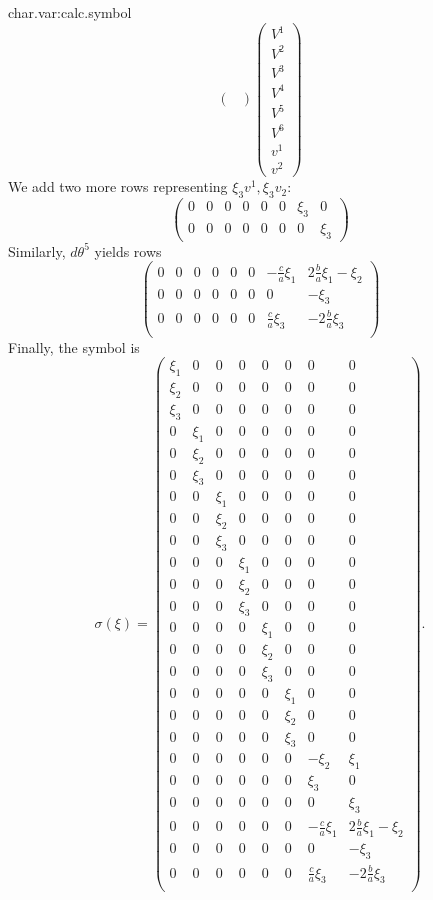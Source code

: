 \begin{answer}{char.var:calc.symbol}
\[\begin{pmatrix}
\end{pmatrix}
\begin{pmatrix}
V^1\\
V^2\\
V^3\\
V^4\\
V^5\\
V^6\\
v^1\\
v^2
\end{pmatrix}
\]
We add two more rows representing \(\xi_3v^1,\xi_3v_2\):
\[
\begin{pmatrix}
0& 0& 0& 0& 0& 0 & \xi_3 & 0 \\
0& 0& 0& 0& 0& 0 & 0 & \xi_3
\end{pmatrix}
\]
Similarly, \(d\theta^5\) yields rows
\[
\begin{pmatrix}
0& 0& 0& 0& 0& 0 & -\frac{c}{a}\xi_1 & 2\frac{b}{a}\xi_1-\xi_2 \\
0& 0& 0& 0& 0& 0 & 0 & -\xi_3 \\
0& 0& 0& 0& 0& 0 & \frac{c}{a}\xi_3 & -2\frac{b}{a}\xi_3 \\
\end{pmatrix}
\]
Finally, the symbol is
\[
\sigma(\xi)=
\begin{pmatrix}
\xi_1 & 0 & 0 & 0 & 0 & 0 & 0 & 0 \\
\xi_2 & 0 & 0 & 0 & 0 & 0 & 0 & 0 \\
\xi_3 & 0 & 0 & 0 & 0 & 0 & 0 & 0 \\
0 & \xi_1 & 0 & 0 & 0 & 0 & 0 & 0 \\
0 & \xi_2 & 0 & 0 & 0 & 0 & 0 & 0 \\
0 & \xi_3 & 0 & 0 & 0 & 0 & 0 & 0 \\
0 & 0 & \xi_1 & 0 & 0 & 0 & 0 & 0 \\
0 & 0 & \xi_2 & 0 & 0 & 0 & 0 & 0 \\
0 & 0 & \xi_3 & 0 & 0 & 0 & 0 & 0 \\
0 & 0 & 0 & \xi_1 & 0 & 0 & 0 & 0 \\
0 & 0 & 0 & \xi_2 & 0 & 0 & 0 & 0 \\
0 & 0 & 0 & \xi_3 & 0 & 0 & 0 & 0 \\
0 & 0 & 0 & 0 & \xi_1 & 0 & 0 & 0 \\
0 & 0 & 0 & 0 & \xi_2 & 0 & 0 & 0 \\
0 & 0 & 0 & 0 & \xi_3 & 0 & 0 & 0 \\
0 & 0 & 0 & 0 & 0 & \xi_1 & 0 & 0 \\
0 & 0 & 0 & 0 & 0 & \xi_2 & 0 & 0 \\
0 & 0 & 0 & 0 & 0 & \xi_3 & 0 & 0 \\
0& 0& 0& 0& 0& 0 & -\xi_2 & \xi_1 \\
0& 0& 0& 0& 0& 0 & \xi_3 & 0 \\
0& 0& 0& 0& 0& 0 & 0 & \xi_3 \\
0& 0& 0& 0& 0& 0 & -\frac{c}{a}\xi_1 & 2\frac{b}{a}\xi_1-\xi_2\\
0& 0& 0& 0& 0& 0 & 0 & -\xi_3 \\
0& 0& 0& 0& 0& 0 & \frac{c}{a}\xi_3 & -2\frac{b}{a}\xi_3 \\
\end{pmatrix}.
\]
\end{answer}
